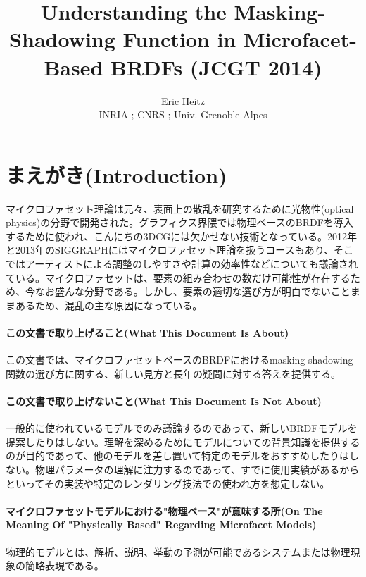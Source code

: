 \documentclass[a4paper,xelatex,ja=standard]{bxjsarticle}
\title{Understanding the Masking-Shadowing Function in Microfacet-Based BRDFs (JCGT 2014)}
\author{Eric Heitz \\ INRIA ; CNRS ; Univ. Grenoble Alpes}
\begin{document}
\maketitle

\section{まえがき(Introduction)}

マイクロファセット理論は元々、表面上の散乱を研究するために光物性(optical physics)の分野で開発された。グラフィクス界隈では物理ベースのBRDFを導入するために使われ、こんにちの3DCGには欠かせない技術となっている。2012年と2013年のSIGGRAPHにはマイクロファセット理論を扱うコースもあり、そこではアーティストによる調整のしやすさや計算の効率性などについても議論されている。マイクロファセットは、要素の組み合わせの数だけ可能性が存在するため、今なお盛んな分野である。しかし、要素の適切な選び方が明白でないことままあるため、混乱の主な原因になっている。

\paragraph{この文書で取り上げること(What This Document Is About)}

この文書では、マイクロファセットベースのBRDFにおけるmasking-shadowing関数の選び方に関する、新しい見方と長年の疑問に対する答えを提供する。

\paragraph{この文書で取り上げないこと(What This Document Is Not About)}

一般的に使われているモデルでのみ議論するのであって、新しいBRDFモデルを提案したりはしない。理解を深めるためにモデルについての背景知識を提供するのが目的であって、他のモデルを差し置いて特定のモデルをおすすめしたりはしない。物理パラメータの理解に注力するのであって、すでに使用実績があるからといってその実装や特定のレンダリング技法での使われ方を想定しない。

\paragraph{マイクロファセットモデルにおける"物理ベース"が意味する所(On The Meaning Of "Physically Based" Regarding Microfacet Models)}

物理的モデルとは、解析、説明、挙動の予測が可能であるシステムまたは物理現象の簡略表現である。
\end{document}
